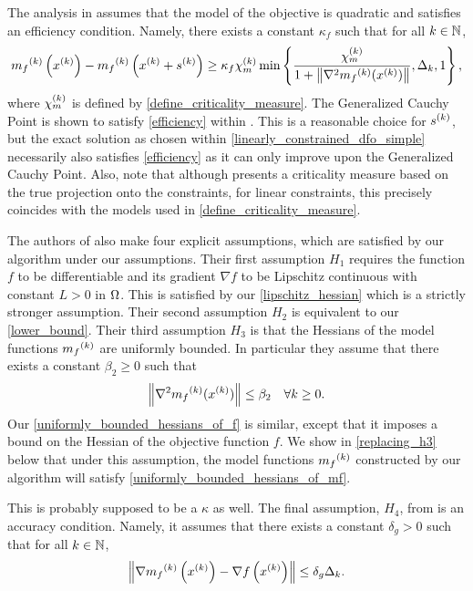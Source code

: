 \documentclass{article}
\begin{document}
The analysis in \cite{Conejo:2013:GCT:2620806.2621814}  assumes that the model of the objective is quadratic and satisfies an efficiency condition.
Namely, there exists a constant $\kappa_f$ such that for all $k \in \mathbb N$,  
\begin{align}
\label{efficiency}
{{m}_f}^{(k)}\left(x^{(k)}\right) - {{m}_f}^{(k)}\left(x^{(k)} + {{s}^{(k)}}\right) \ge \kappa_f {\chi_m^{(k)}} \min\left\{ \frac{{\chi_m^{(k)}}}{1+\left\|\nabla^2 {{m}_f}^{(k)}(x^{(k)})\right\|}, \Delta_k, 1 \right\},
\end{align}
where ${\chi_m^{(k)}}$ is defined by \cref{define_criticality_measure}.
The Generalized Cauchy Point is shown to satisfy \cref{efficiency} within \cite{Conn:2000:TM:357813}.
This is a reasonable choice for ${{s}^{(k)}}$, but the exact solution as chosen within \cref{linearly_constrained_dfo_simple} 
necessarily also satisfies \cref{efficiency} as it can only improve upon the Generalized Cauchy Point.
Also, note that although \cite{Conejo:2013:GCT:2620806.2621814} presents a criticality measure based on the true projection onto the constraints,
for linear constraints, this precisely coincides with the models used in \cref{define_criticality_measure}.

The authors of \cite{Conejo:2013:GCT:2620806.2621814} also make four explicit assumptions, which are satisfied by our algorithm under our assumptions.     
Their first assumption $H_1$ requires the function $f$ to be differentiable and its gradient $\nabla f$ to be Lipschitz continuous with constant $L > 0$ in $\Omega$.  This is satisfied by our 
\cref{lipschitz_hessian} which is a strictly stronger assumption.
Their second assumption $H_2$ is equivalent to our \cref{lower_bound}.    Their third assumption $H_3$ is that
the Hessians of the model functions ${{m}_f}^{(k)}$ are uniformly bounded.    In particular they assume that there exists a constant $\beta_2 \ge 0$ such that
\begin{equation}\label{uniformly_bounded_hessians_of_mf}
 \left\|\nabla^2 {{m}_f}^{(k)}(x^{(k)})\right\| \le \beta_2 \quad \forall k \ge 0.
 \end{equation}
Our  \cref{uniformly_bounded_hessians_of_f}
 is similar, except that it imposes a bound on the Hessian of the objective function $f$.    We show in \cref{replacing_h3} below that under this assumption,  the model functions ${{m}_f}^{(k)}$ constructed by our algorithm will satisfy \cref{uniformly_bounded_hessians_of_mf}.

\color{magenta}
This is probably supposed to be a $\kappa$ as well.
\color{black}
The final assumption, $H_4$,  from \cite{Conejo:2013:GCT:2620806.2621814} is an accuracy condition.
Namely, it assumes that there exists a constant $\delta_g > 0$ such that for all $k \in \mathbb N$,
\begin{equation}
\label{accuracy}
\left\| \nabla {{m}_f}^{(k)}\left(x^{(k)}\right) - \nabla f\left(x^{(k)}\right) \right\| \le \delta_g \Delta_k.
\end{equation}
\end{document}
